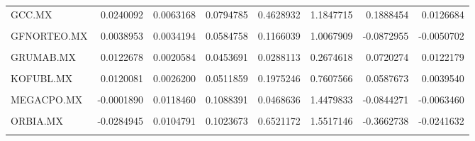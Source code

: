 \begin{table}
\begin{tabular}{lrrrrrrr}
GCC.MX & 0.0240092 & 0.0063168 & 0.0794785 & 0.4628932 & 1.1847715 & 0.1888454 & 0.0126684\\
\cellcolor{gray!10}{GENTERA.MX} & \cellcolor{gray!10}{0.0151337} & \cellcolor{gray!10}{0.0078609} & \cellcolor{gray!10}{0.0886615} & \cellcolor{gray!10}{0.4397747} & \cellcolor{gray!10}{0.9884736} & \cellcolor{gray!10}{0.0691812} & \cellcolor{gray!10}{0.0062052}\\
GFNORTEO.MX & 0.0038953 & 0.0034194 & 0.0584758 & 0.1166039 & 1.0067909 & -0.0872955 & -0.0050702\\
\cellcolor{gray!10}{GMEXICOB.MX} & \cellcolor{gray!10}{0.0190491} & \cellcolor{gray!10}{0.0067870} & \cellcolor{gray!10}{0.0823833} & \cellcolor{gray!10}{0.6786344} & \cellcolor{gray!10}{1.4535268} & \cellcolor{gray!10}{0.1219797} & \cellcolor{gray!10}{0.0069136}\\
\addlinespace
GRUMAB.MX & 0.0122678 & 0.0020584 & 0.0453691 & 0.0288113 & 0.2674618 & 0.0720274 & 0.0122179\\
\cellcolor{gray!10}{KIMBERA.MX} & \cellcolor{gray!10}{0.0002062} & \cellcolor{gray!10}{0.0039735} & \cellcolor{gray!10}{0.0630359} & \cellcolor{gray!10}{-0.4691466} & \cellcolor{gray!10}{1.0824430} & \cellcolor{gray!10}{-0.1395038} & \cellcolor{gray!10}{-0.0081240}\\
KOFUBL.MX & 0.0120081 & 0.0026200 & 0.0511859 & 0.1975246 & 0.7607566 & 0.0587673 & 0.0039540\\
\cellcolor{gray!10}{LABB.MX} & \cellcolor{gray!10}{0.0226350} & \cellcolor{gray!10}{0.0083714} & \cellcolor{gray!10}{0.0914952} & \cellcolor{gray!10}{0.2232500} & \cellcolor{gray!10}{0.4687866} & \cellcolor{gray!10}{0.1490237} & \cellcolor{gray!10}{0.0290856}\\
MEGACPO.MX & -0.0001890 & 0.0118460 & 0.1088391 & 0.0468636 & 1.4479833 & -0.0844271 & -0.0063460\\
\addlinespace
\cellcolor{gray!10}{OMAB.MX} & \cellcolor{gray!10}{0.0170888} & \cellcolor{gray!10}{0.0107199} & \cellcolor{gray!10}{0.1035367} & \cellcolor{gray!10}{-0.6533585} & \cellcolor{gray!10}{1.4557622} & \cellcolor{gray!10}{0.0781246} & \cellcolor{gray!10}{0.0055564}\\
ORBIA.MX & -0.0284945 & 0.0104791 & 0.1023673 & 0.6521172 & 1.5517146 & -0.3662738 & -0.0241632\\
\cellcolor{gray!10}{PINFRA.MX} & \cellcolor{gray!10}{0.0103216} & \cellcolor{gray!10}{0.0048488} & \cellcolor{gray!10}{0.0696334} & \cellcolor{gray!10}{0.2520774} & \cellcolor{gray!10}{1.0868674} & \cellcolor{gray!10}{0.0189795} & \cellcolor{gray!10}{0.0012160}\\

\end{tabular}
\end{table}
